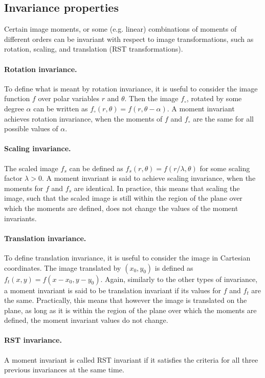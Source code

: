 \subsection{Invariance properties}
Certain image moments, or some (e.g. linear) combinations of moments of different orders can be invariant with respect to image transformations, such as rotation, scaling, and translation (RST transformations).

\paragraph{Rotation invariance.} To define what is meant by rotation invariance, it is useful to consider the image function $f$ over polar variables $r$ and $\theta$. Then the image $f_{\circ}$, rotated by some degree $\alpha$ can be written as $f_{\circ}(r,\theta) = f(r,\theta - \alpha)$. A moment invariant achieves rotation invariance, when the moments of $f$ and $f_{\circ}$ are the same for all possible values of $\alpha$.   

\paragraph{Scaling invariance.} The scaled image $f_{s}$ can be defined as $f_{s}(r, \theta) = f(r / \lambda, \theta)$ for some scaling factor $\lambda > 0$. A moment invariant is said to achieve scaling invariance, when the moments for $f$ and $f_{s}$ are identical. In practice, this means that scaling the image, such that the scaled image is still within the region of the plane over which the moments are defined, does not change the values of the moment invariants.

\paragraph{Translation invariance.} To define translation invariance, it is useful to consider the image in Cartesian coordinates. The image translated by $(x_0, y_0)$ is defined as $f_{t}(x,y) = f(x - x_0, y - y_0)$. Again, similarly to the other types of invariance, a moment invariant is said to be translation invariant if its values for $f$ and $f_{t}$ are the same. Practically, this means that however the image is translated on the plane, as long as it is within the region of the plane over which the moments are defined, the moment invariant values do not change.

\paragraph{RST invariance.} A moment invariant is called RST invariant if it satisfies the criteria for all three previous invariances at the same time. 


